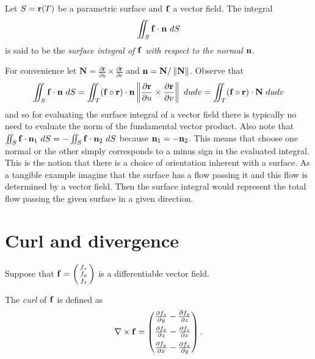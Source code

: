 \begin{definition}%
    \label{def:surf-int-vector}
    Let \(S=\mathbf{r}(T)\) be a parametric surface and \(\mathbf{f}\) a vector field.
    The integral
    \[
        \iint_S \mathbf{f} \cdot \mathbf{n} \ dS
    \]
    is said to be the \emph{surface integral of \(\mathbf{f}\) with respect to the normal \(\mathbf{n}\)}.
\end{definition}

For convenience let \(\mathbf{N}  = \frac{\partial  \mathbf{r} }{\partial u} \times \frac{\partial  \mathbf{r} }{\partial v}\)
and \(\mathbf{n} = \mathbf{N}/\left\|\mathbf{N}\right\|\).
Observe that
\[
    \iint_S \mathbf{f} \cdot \mathbf{n} \ dS
    = \iint_{T} (\mathbf{f}\circ \mathbf{r}) \cdot \mathbf{n}  \left\|\frac{\partial  \mathbf{r} }{\partial u} \times \frac{\partial  \mathbf{r} }{\partial v}\right\|  \ du dv
    = \iint_{T} (\mathbf{f}\circ \mathbf{r}) \cdot \mathbf{N}    \ du dv
\]
and so for evaluating the surface integral of a vector field there is typically no need to evaluate the norm of the fundamental vector product.
Also note that \(\iint_S \mathbf{f} \cdot \mathbf{n}_1 \ dS = - \iint_S \mathbf{f} \cdot \mathbf{n}_2 \ dS\) because \(\mathbf{n}_1 = - \mathbf{n}_2\).
This means that choose one normal or the other simply corresponds to a minus sign in the evaluated integral.
This is the notion that there is a choice of orientation inherent with a surface.
As a tangible example imagine that the surface has a flow passing it and this flow is determined by a vector field.
Then the surface integral would represent the total flow passing the given surface in a given direction.

\section{Curl and divergence}

Suppose that \(\mathbf{f} = \left(\begin{smallmatrix}
        f_x \\ f_y \\ f_z
    \end{smallmatrix}\right)\)
is a differentiable vector field.

\begin{definition}[curl]%
    \label{def:curl}
    The \emph{curl} of \(\mathbf{f}\) is defined as
    \[
        \nabla \times \mathbf{f} = \begin{pmatrix}
            \frac{\partial f_z}{\partial y} - \frac{\partial f_y}{\partial z} \\[.5em]
            \frac{\partial f_x}{\partial z} - \frac{\partial f_z}{\partial x} \\[.5em]
            \frac{\partial f_y}{\partial x} - \frac{\partial f_x}{\partial y}
        \end{pmatrix}.
    \]
\end{definition}

